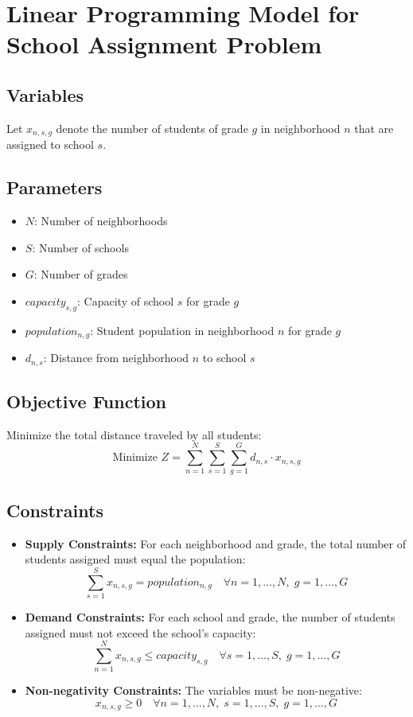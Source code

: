 \documentclass{article}
\begin{document}
\section*{Linear Programming Model for School Assignment Problem}

\subsection*{Variables}
Let \( x_{n,s,g} \) denote the number of students of grade \( g \) in neighborhood \( n \) that are assigned to school \( s \).

\subsection*{Parameters}
\begin{itemize}
    \item \( N \): Number of neighborhoods
    \item \( S \): Number of schools
    \item \( G \): Number of grades
    \item \( capacity_{s,g} \): Capacity of school \( s \) for grade \( g \)
    \item \( population_{n,g} \): Student population in neighborhood \( n \) for grade \( g \)
    \item \( d_{n,s} \): Distance from neighborhood \( n \) to school \( s \)
\end{itemize}

\subsection*{Objective Function}
Minimize the total distance traveled by all students:
\[
\text{Minimize } Z = \sum_{n=1}^{N} \sum_{s=1}^{S} \sum_{g=1}^{G} d_{n,s} \cdot x_{n,s,g}
\]

\subsection*{Constraints}
\begin{itemize}
    \item \textbf{Supply Constraints:} For each neighborhood and grade, the total number of students assigned must equal the population:
    \[
    \sum_{s=1}^{S} x_{n,s,g} = population_{n,g} \quad \forall n = 1, \ldots, N, \; g = 1, \ldots, G
    \]
    
    \item \textbf{Demand Constraints:} For each school and grade, the number of students assigned must not exceed the school's capacity:
    \[
    \sum_{n=1}^{N} x_{n,s,g} \leq capacity_{s,g} \quad \forall s = 1, \ldots, S, \; g = 1, \ldots, G
    \]
    
    \item \textbf{Non-negativity Constraints:} The variables must be non-negative:
    \[
    x_{n,s,g} \geq 0 \quad \forall n = 1, \ldots, N, \; s = 1, \ldots, S, \; g = 1, \ldots, G
    \]
\end{itemize}
\end{document}

